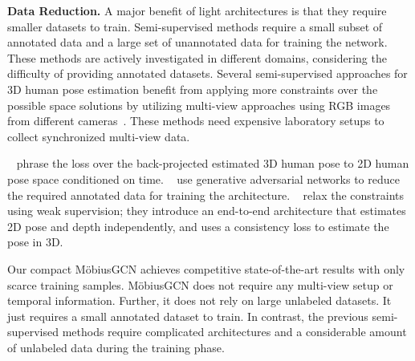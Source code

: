 \documentclass[runningheads]{llncs}
\begin{document}
\textbf{Data Reduction.} 
 A major benefit of light architectures is that they require smaller datasets to train.
Semi-supervised methods require a small subset of annotated data and a large set of unannotated data for training the network. These methods are actively investigated in different domains, considering the difficulty of providing annotated datasets.
Several semi-supervised approaches for 3D human pose estimation benefit from applying more constraints over the possible space solutions by utilizing multi-view approaches using RGB images from different cameras~\cite{rhodin2018unsupervised, rhodin2018learning, yao2019monet, wandt2021canonpose, mitra2020multiview}. 
These methods need expensive laboratory setups to collect synchronized multi-view data.

~\citet{pavllo20193d} phrase the loss over the back-projected estimated 3D human pose to 2D human pose space conditioned on time. 
~\citet{tung2017adversarial} use generative adversarial networks to reduce the required annotated data for training the architecture. 
~\citet{iqbal2020weakly} relax the constraints using weak supervision; they introduce an end-to-end architecture that estimates 2D pose and depth independently, and uses a consistency loss to estimate the pose in 3D.

Our compact M\"obiusGCN achieves competitive state-of-the-art results with only scarce training samples. M\"obiusGCN does not require any multi-view setup or temporal information. Further, it does not rely on large unlabeled datasets. It just requires a small annotated dataset to train. In contrast, the previous semi-supervised methods require complicated architectures and a considerable amount of unlabeled data during the training phase. 
\end{document}
